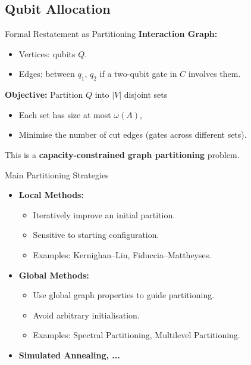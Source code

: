 \documentclass{beamer}
\begin{document}
	\subsection{Qubit Allocation}
	
	\begin{frame}{Formal Restatement as Partitioning}
		\textbf{Interaction Graph:}
		\begin{itemize}
			\item Vertices: qubits $Q$.
			\item Edges: between $q_1$, $q_2$ if a two-qubit gate in $C$ involves them.
		\end{itemize}
		
		\textbf{Objective:} Partition $Q$ into $|V|$ disjoint sets
		\begin{itemize}
			\item Each set has size at most $\omega(A)$,
			\item Minimise the number of cut edges (gates across different sets).
		\end{itemize}
		This is a \textbf{capacity-constrained graph partitioning} problem.
	\end{frame}
	
	\begin{frame}{Main Partitioning Strategies}
		\begin{itemize}
			\item \textbf{Local Methods:}
			\begin{itemize}
				\item Iteratively improve an initial partition.
				\item Sensitive to starting configuration.
				\item Examples: Kernighan–Lin, Fiduccia–Mattheyses.
			\end{itemize}
			\item \textbf{Global Methods:}
			\begin{itemize}
				\item Use global graph properties to guide partitioning.
				\item Avoid arbitrary initialisation.
				\item Examples: Spectral Partitioning, Multilevel Partitioning.
			\end{itemize}
			\item \textbf{Simulated Annealing, ...}
		\end{itemize}
	\end{frame}
	
\end{document}
